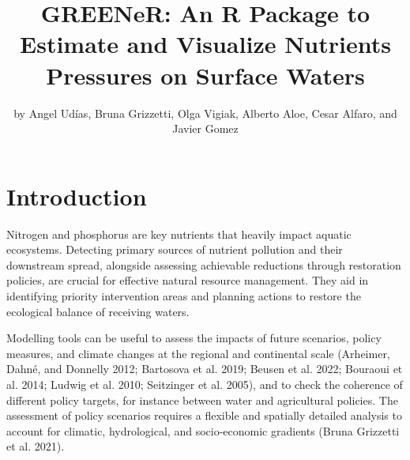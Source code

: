 \title{GREENeR: An R Package to Estimate and Visualize Nutrients Pressures on Surface Waters}


\author{by Angel Udías, Bruna Grizzetti, Olga Vigiak, Alberto Aloe, Cesar Alfaro, and Javier Gomez}

\maketitle


\hypertarget{introduction}{%
\section{Introduction}\label{introduction}}

Nitrogen and phosphorus are key nutrients that heavily impact aquatic ecosystems. Detecting primary sources of nutrient pollution and their downstream spread, alongside assessing achievable reductions through restoration policies, are crucial for effective natural resource management. They aid in identifying priority intervention areas and planning actions to restore the ecological balance of receiving waters.

Modelling tools can be useful to assess the impacts of future scenarios, policy measures, and climate changes at the regional and continental scale (Arheimer, Dahné, and Donnelly 2012; Bartosova et al. 2019; Beusen et al. 2022; Bouraoui et al. 2014; Ludwig et al. 2010; Seitzinger et al. 2005), and to check the coherence of different policy targets, for instance between water and agricultural policies. The assessment of policy scenarios requires a flexible and spatially detailed analysis to account for climatic, hydrological, and socio-economic gradients (Bruna Grizzetti et al. 2021).

